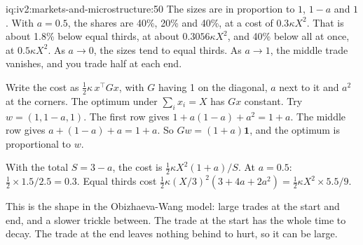 \begin{solution}{iq:iv2:markets-and-microstructure:50}
The sizes are in proportion to $1$, $1 - a$ and $1$. With $a = 0.5$, the shares are 40\%, 20\% and 40\%, at a cost of $0.3\kappa X^2$. That is about 1.8\% below equal thirds, at about $0.3056\kappa X^2$, and 40\% below all at once, at $0.5\kappa X^2$. As $a \to 0$, the sizes tend to equal thirds. As $a \to 1$, the middle trade vanishes, and you trade half at each end.

Write the cost as $\tfrac12\kappa\,x^\top Gx$, with $G$ having 1 on the diagonal, $a$ next to it and $a^2$ at the corners. The optimum under $\sum_i x_i = X$ has $Gx$ constant. Try $w = (1, 1 - a, 1)$. The first row gives $1 + a(1 - a) + a^2 = 1 + a$. The middle row gives $a + (1 - a) + a = 1 + a$. So $Gw = (1 + a)\mathbf 1$, and the optimum is proportional to $w$.

With the total $S = 3 - a$, the cost is $\tfrac12\kappa X^2(1 + a)/S$. At $a = 0.5$: $\tfrac12 \times 1.5/2.5 = 0.3$. Equal thirds cost $\tfrac12\kappa(X/3)^2(3 + 4a + 2a^2) = \tfrac12\kappa X^2 \times 5.5/9$.

This is the shape in the Obizhaeva-Wang model: large trades at the start and end, and a slower trickle between. The trade at the start has the whole time to decay. The trade at the end leaves nothing behind to hurt, so it can be large.

\end{solution}
